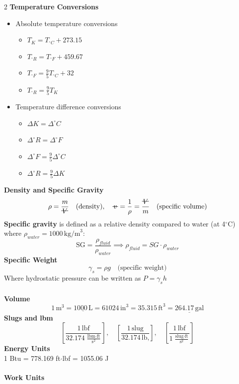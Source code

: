 \documentclass[10pt, fleqn]{article}
\newcommand{\vol}{\mathord{\text{\ooalign{\hidewidth $V$\hidewidth\cr\kern-0.5pt\raisebox{0.8ex}{\rule[0pt]{1em}{0.5pt}}}}}}
\newcommand{\svol}{%
  \mathord{\text{\ooalign{%
    \hfil$v$\hfil\cr
    \hfil\rule[0.6ex]{0.8em}{0.5pt}\hfil
  }}}%
}
\begin{document}
\begin{multicols}{2}
\textbf{Temperature Conversions}
\begin{itemize}[label=\textbullet]
    \item Absolute temperature conversions
    \begin{itemize}[label=\textopenbullet]
        \item $T_{K} = T_{^\circ C} + 273.15$
        \item $T_{^\circ R} = T_{^\circ F} + 459.67$
        \item $T_{^\circ F} = \frac{9}{5}T_{^\circ C} + 32$
        \item $T_{^\circ R} = \frac{9}{5}T_{K}$
    \end{itemize}
    \item Temperature difference conversions
    \begin{itemize}[label=\textopenbullet]
        \item $\Delta K = \Delta ^\circ C$
        \item $\Delta ^\circ R = \Delta ^\circ F$
        \item $\Delta ^\circ F = \frac{9}{5}\Delta ^\circ C$
        \item $\Delta ^\circ R = \frac{9}{5}\Delta K$
    \end{itemize}
\end{itemize}
\textbf{Density and Specific Gravity}
\[\rho = \frac{m}{\vol}\quad \text{(density)}, \quad \svol = \frac{1}{\rho} = \frac{\vol}{m}  \quad \text{(specific volume)}\]
\textbf{Specific gravity} is defined as a relative density compared to water (at 4$^\circ$C) where $\rho_{water} = 1000\,\text{kg/m}^3$:
\[\text{SG} = \frac{\rho_{fluid}}{\rho_{water}} \implies \rho_{fluid} = SG \cdot \rho_{water}\]
\textbf{Specific Weight}
\[\gamma_s = \rho g \quad \text{(specific weight)}\]
Where hydrostatic pressure can be written as $P = \gamma_s h$\\\\
\textbf{Volume}
\[1\,\text{m}^3 = \underline{1000\,\text{L}} = 61024\,\text{in}^3 = 35.315\,\text{ft}^3=\underline{264.17\,\text{gal}}\]
\textbf{Slugs and lbm}
\[\left[\frac{1\,\text{lbf}}{32.174\,\frac{\text{lbm}\cdot\text{ft}}{\text{s}^2}}\right],\quad
\left[\frac{1\,\text{slug}}{32.174\,\text{lb,}}\right], \quad
\left[\frac{1\,\text{lbf}}{1\,\frac{\text{slug}\cdot\text{ft}}{\text{s}^2}}\right]\]
\textbf{Energy Units}\\
1 Btu = 778.169 ft$\cdot$lbf = 1055.06 J\\\\
\textbf{Work Units}\\

\end{multicols}
\end{document}
